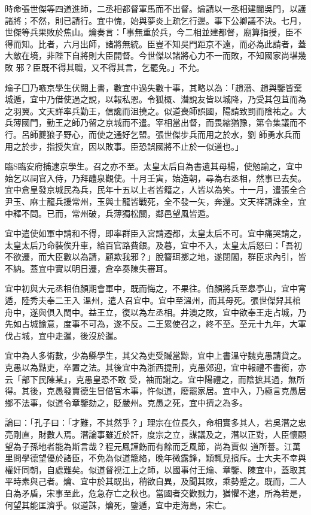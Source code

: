 \begin{pinyinscope}
 時命張世傑等四道進師，二丞相都督軍馬而不出督。爚請以一丞相建閫吳門，以護諸將；不然，則已請行。宜中愧，始與夢炎上疏乞行邊。事下公卿議不決。七月，世傑等兵果敗於焦山。爚奏言：「事無重於兵，今二相並建都督，廟算指授，臣不得而知。比者，六月出師，諸將無統。臣豈不知吳門距京不遠，而必為此請者，蓋大敵在境，非陛下自將則大臣開督。今世傑以諸將心力不一而敗，不知國家尚堪幾敗
 邪？臣既不得其職，又不得其言，乞罷免。」不允。



 爚子囗乃嗾京學生伏闕上書，數宜中過失數十事，其略以為：「趙溍、趙與鑒皆棄城遁，宜中乃借使過之說，以報私恩。令狐概、潛說友皆以城降，乃受其包苴而為之羽翼。文天詳率兵勤王，信讒而沮撓之。似道喪師誤國，陽請致罰而陰祐之。大兵薄國門，勤王之師乃留之京城而不遣。宰相當出督，而畏縮猶豫，第令集議而不行。呂師夔狼子野心，而使之通好乞盟。張世傑步兵而用之於水，劉
 師勇水兵而用之於步，指授失宜，因以敗事。臣恐誤國將不止於一似道也。」



 臨S臨安府捕逮京學生。召之亦不至。太皇太后自為書遺其母楊，使勉諭之，宜中始乞以祠官入侍，乃拜醴泉觀使。十月壬寅，始造朝，尋為右丞相，然事已去矣。宜中倉皇發京城民為兵，民年十五以上者皆籍之，人皆以為笑。十一月，遣張全合尹玉、麻士龍兵援常州，玉與士龍皆戰死，全不發一矢，奔還。文天祥請誅全，宜
 中釋不問。已而，常州破，兵薄獨松關，鄰邑望風皆遁。



 宜中遣使如軍中請和不得，即率群臣入宮請遷都，太皇太后不可。宜中痛哭請之，太皇太后乃命裝俟升車，給百官路費銀。及暮，宜中不入，太皇太后怒曰：「吾初不欲遷，而大臣數以為請，顧欺我邪？」脫簪珥擲之地，遂閉閣，群臣求內引，皆不納。蓋宜中實以明日遷，倉卒奏陳失審耳。



 宜中初與大元丞相伯顏期會軍中，既而悔之，不果往。伯顏將兵至皋亭山，宜中宵遁，陸秀夫奉二王入
 溫州，遣人召宜中。宜中至溫州，而其母死。張世傑舁其棺舟中，遂與俱入閩中。益王立，復以為左丞相。井澳之敗，宜中欲奉王走占城，乃先如占城諭意，度事不可為，遂不反。二王累使召之，終不至。至元十九年，大軍伐占城，宜中走暹，後沒於暹。



 宜中為人多術數，少為縣學生，其父為吏受贓當黥，宜中上書溫守魏克愚請貸之。克愚以為黠吏，卒置之法。其後宜中為浙西提刑，克愚郊迎，宜中報禮不書銜，亦云「部下民陳某』，克愚皇恐不敢
 受，袖而謝之。宜中陽禮之，而陰摭其過，無所得。其後，克愚發賈德生冒借官木事，忤似道，廢罷家居。宜中入，乃極言克愚居鄉不法事，似道令章鑒劾之，貶嚴州。克愚之死，宜中擠之為多。



 論曰：「孔子曰：「才難，不其然乎？」理宗在位長久，命相實多其人，若吳潛之忠亮剛直，財數人焉。潛論事雖近於訐，度宗之立，謀議及之，潛以正對，人臣懷顧望為子孫地者能為斯言哉？程元鳳謹飭而有餘而乏風節，尚為賈似
 道所諅。江萬里問學德望優於諸臣，不免為似道籠絡，晚年微露鋒，穎輒見擯斥。士大夫不幸與權奸同朝，自處難矣。似道督視江上之師，以國事付王爚、章鑒、陳宜中，蓋取其平時素與己者。爚、宜中於其既出，稍欲自異，及聞其敗，乘勢蹙之。既而，二人自為矛盾，宋事至此，危急存亡之秋也。當國者交歡戮力，猶懼不逮，所為若是，何望其能匡濟乎。似道誅，爚死，鑒遁，宜中走海島，宋亡。




\end{pinyinscope}
